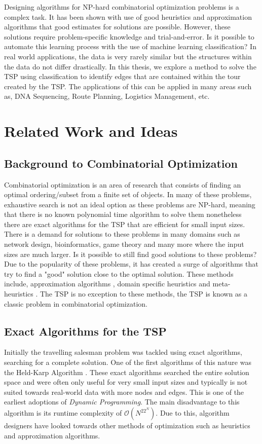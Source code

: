 \documentclass[]{UCD_CS_FYP_Report}
\begin{document}
Designing algorithms for NP-hard combinatorial optimization problems is a complex task. It has been shown with use of good heuristics and approximation algorithms that good estimates for solutions are possible. However, these solutions require problem-specific knowledge and trial-and-error. Is it possible to automate this learning process with the use of machine learning classification? In real world applications, the data is very rarely similar but the structures within the data do not differ drastically. In this thesis, we explore a method to solve the TSP using classification to identify edges that are contained within the tour created by the TSP. The applications of this can be applied in many areas such as, DNA Sequencing, Route Planning, Logistics Management, etc.

\chapter{Related Work and Ideas}
\section{Background to Combinatorial Optimization}
Combinatorial optimization is an area of research that consists of finding an optimal ordering/subset from a finite set of objects. In many of these problems, exhaustive search is not an ideal option as these problems are NP-hard, meaning that there is no known polynomial time algorithm to solve them nonetheless there are exact algorithms \cite{Bellman:1962:DPT:321105.321111} for the TSP that are efficient for small input sizes. There is a demand for solutions to these problems in many domains such as network design, bioinformatics, game theory and many more \cite{combApplications} where the input sizes are much larger. Is it possible to still find good solutions to these problems? Due to the popularity of these problems, it has created a surge of algorithms that try to find a "good" solution close to the optimal solution. These methods include, approximation algorithms \cite{JohnMcGe97}, domain specific heuristics\cite{davidapplegate2007} and meta-heuristics \cite{Larranaga1999, NatureBasedHeuristics}. The TSP is no exception to these methods, the TSP is known as a classic problem in combinatorial optimization. 

\section{Exact Algorithms for the TSP}
Initially the travelling salesman problem was tackled using exact algorithms, searching for a complete solution. One of the first algorithms of this nature was the Held-Karp Algorithm \cite{Bellman:1962:DPT:321105.321111}. These exact algorithms searched the entire solution space and were often only useful for very small input sizes and typically is not suited towards real-world data with more nodes and edges. This is one of the earliest adoptions of \textit{Dynamic Programming}. The main disadvantage to this algorithm is its runtime complexity of $\mathcal{O}(N^22^N)$. Due to this, algorithm designers have looked towards other methods of optimization such as heuristics and approximation algorithms.
\end{document}
